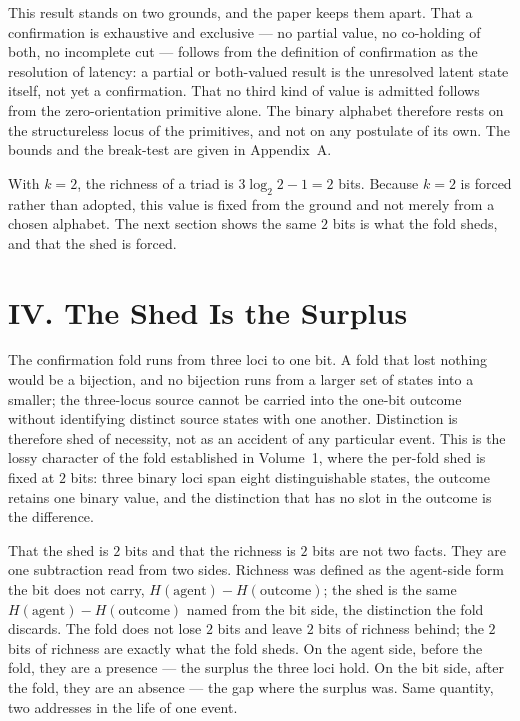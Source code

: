 \documentclass[11pt,oneside]{report}
\theoremstyle{definition}
\theoremstyle{remark}
\begin{document}
This result stands on two grounds, and the paper keeps them apart. That a confirmation is
exhaustive and exclusive --- no partial value, no co-holding of both, no incomplete cut ---
follows from the definition of confirmation as the resolution of latency: a partial or
both-valued result is the unresolved latent state itself, not yet a confirmation. That no third
kind of value is admitted follows from the zero-orientation primitive alone. The binary alphabet
therefore rests on the structureless locus of the primitives, and not on any postulate of its
own. The bounds and the break-test are given in Appendix~A.

With \ensuremath{k = 2}, the richness of a triad is \ensuremath{3\log_2 2 - 1 = 2} bits. Because
\ensuremath{k = 2} is forced rather than adopted, this value is fixed from the ground and not
merely from a chosen alphabet. The next section shows the same \ensuremath{2} bits is what the
fold sheds, and that the shed is forced.

\section*{IV. The Shed Is the Surplus}

The confirmation fold runs from three loci to one bit. A fold that lost nothing would be a
bijection, and no bijection runs from a larger set of states into a smaller; the three-locus
source cannot be carried into the one-bit outcome without identifying distinct source states
with one another. Distinction is therefore shed of necessity, not as an accident of any
particular event. This is the lossy character of the fold established in Volume~1, where the
per-fold shed is fixed at \ensuremath{2} bits: three binary loci span eight distinguishable
states, the outcome retains one binary value, and the distinction that has no slot in the
outcome is the difference.

That the shed is \ensuremath{2} bits and that the richness is \ensuremath{2} bits are not two
facts. They are one subtraction read from two sides. Richness was defined as the agent-side form
the bit does not carry, \ensuremath{H(\text{agent}) - H(\text{outcome})}; the shed is the same
\ensuremath{H(\text{agent}) - H(\text{outcome})} named from the bit side, the distinction the
fold discards. The fold does not lose \ensuremath{2} bits and leave \ensuremath{2} bits of
richness behind; the \ensuremath{2} bits of richness are exactly what the fold sheds. On the
agent side, before the fold, they are a presence --- the surplus the three loci hold. On the bit
side, after the fold, they are an absence --- the gap where the surplus was. Same quantity, two
addresses in the life of one event.
\end{document}
